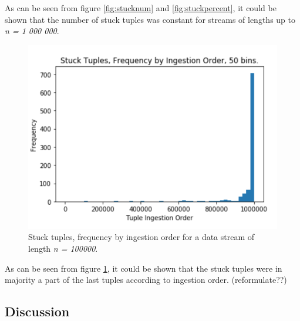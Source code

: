 \noindent As can be seen from figure \ref{fig:stucknum} and \ref{fig:stuckpercent}, it could be shown that the number of stuck tuples was constant for streams of lengths up to \textit{n = 1 000 000}. 


\begin{figure}[H]
    \centering
    \includegraphics[scale=0.8]{Images/tupledistribution.png}
    \caption{Stuck tuples, frequency by ingestion order for a data stream of length \textit{n = 100000}. }
    \label{fig:stuckdist}
\end{figure}

\noindent As can be seen from figure \ref{fig:stuckdist}, it could be shown that the stuck tuples were in majority a part of the last tuples according to ingestion order. (reformulate??) 

\subsection{Discussion}




